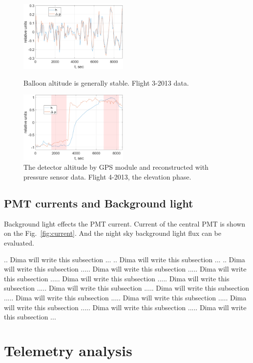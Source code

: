 \documentclass[final,5p,times,twocolumn]{elsarticle}
\begin{document}
\begin{figure}[t]
    \includegraphics[width=0.48\textwidth]{figs/good_corr.eps}
    \caption{Balloon altitude is generally stable. Flight 3-2013 data.}
    \label{fig:dp-h-good}
    \vspace{1pc}

    \includegraphics[width=0.48\textwidth]{figs/bad_corr.eps}
    \caption{The detector altitude by GPS module and reconstructed with pressure sensor data. Flight 4-2013, the elevation phase.}
    \label{fig:dp-h-bad}
\end{figure}


\subsection{PMT currents and Background light}

Background light effects the PMT current. Current of the central PMT is shown on the Fig.~\ref{fig:current}. And the night sky background light flux can be evaluated.

.. Dima will write this subsection ...
.. Dima will write this subsection ...
.. Dima will write this subsection ..... Dima will write this subsection ..... Dima will write this subsection ..... Dima will write this subsection ..... Dima will write this subsection ..... Dima will write this subsection ..... Dima will write this subsection ..... Dima will write this subsection ..... Dima will write this subsection ..... Dima will write this subsection ..... Dima will write this subsection ..... Dima will write this subsection ...


\section{Telemetry analysis}
\end{document}
